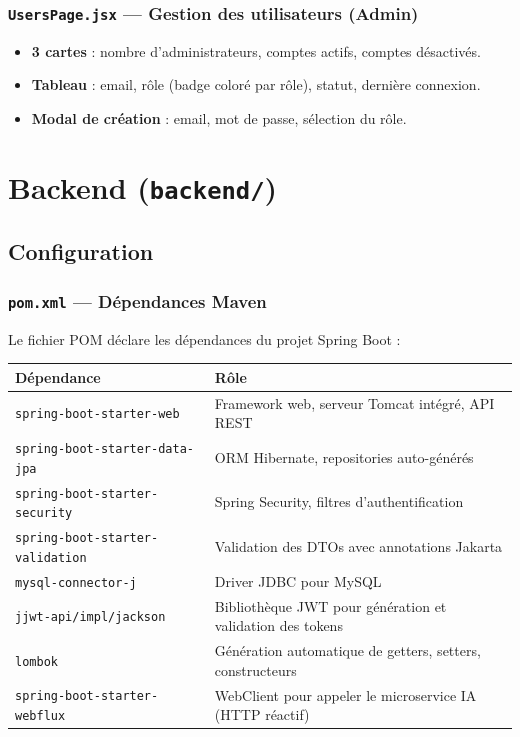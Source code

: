 \documentclass[a4paper,12pt]{report}
\begin{document}
\subsection{\texttt{UsersPage.jsx} --- Gestion des utilisateurs (Admin)}
\begin{itemize}
  \item \textbf{3 cartes} : nombre d'administrateurs, comptes actifs, comptes désactivés.
  \item \textbf{Tableau} : email, rôle (badge coloré par rôle), statut, dernière connexion.
  \item \textbf{Modal de création} : email, mot de passe, sélection du rôle.
\end{itemize}


\chapter{Backend (\texttt{backend/})}

\section{Configuration}

\subsection{\texttt{pom.xml} --- Dépendances Maven}
Le fichier POM déclare les dépendances du projet Spring Boot :

\begin{center}
\begin{tabularx}{\textwidth}{|l|X|}
\hline
\textbf{Dépendance} & \textbf{Rôle} \\
\hline
\texttt{spring-boot-starter-web} & Framework web, serveur Tomcat intégré, API REST \\
\hline
\texttt{spring-boot-starter-data-jpa} & ORM Hibernate, repositories auto-générés \\
\hline
\texttt{spring-boot-starter-security} & Spring Security, filtres d'authentification \\
\hline
\texttt{spring-boot-starter-validation} & Validation des DTOs avec annotations Jakarta \\
\hline
\texttt{mysql-connector-j} & Driver JDBC pour MySQL \\
\hline
\texttt{jjwt-api/impl/jackson} & Bibliothèque JWT pour génération et validation des tokens \\
\hline
\texttt{lombok} & Génération automatique de getters, setters, constructeurs \\
\hline
\texttt{spring-boot-starter-webflux} & WebClient pour appeler le microservice IA (HTTP réactif) \\
\hline
\end{tabularx}
\end{center}
\end{document}

